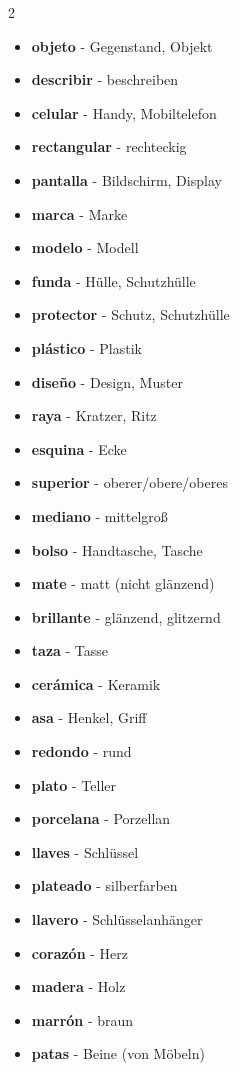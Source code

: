 \documentclass[12pt,a4paper]{article}
\begin{document}
\begin{multicols}{2}
\begin{itemize}[leftmargin=*]
    \item \textbf{objeto} - Gegenstand, Objekt
    \item \textbf{describir} - beschreiben
    \item \textbf{celular} - Handy, Mobiltelefon
    \item \textbf{rectangular} - rechteckig
    \item \textbf{pantalla} - Bildschirm, Display
    \item \textbf{marca} - Marke
    \item \textbf{modelo} - Modell
    \item \textbf{funda} - Hülle, Schutzhülle
    \item \textbf{protector} - Schutz, Schutzhülle
    \item \textbf{plástico} - Plastik
    \item \textbf{diseño} - Design, Muster
    \item \textbf{raya} - Kratzer, Ritz
    \item \textbf{esquina} - Ecke
    \item \textbf{superior} - oberer/obere/oberes
    \item \textbf{mediano} - mittelgroß
    \item \textbf{bolso} - Handtasche, Tasche
    \item \textbf{mate} - matt (nicht glänzend)
    \item \textbf{brillante} - glänzend, glitzernd
    \item \textbf{taza} - Tasse
    \item \textbf{cerámica} - Keramik
    \item \textbf{asa} - Henkel, Griff
    \item \textbf{redondo} - rund
    \item \textbf{plato} - Teller
    \item \textbf{porcelana} - Porzellan
    \item \textbf{llaves} - Schlüssel
    \item \textbf{plateado} - silberfarben
    \item \textbf{llavero} - Schlüsselanhänger
    \item \textbf{corazón} - Herz
    \item \textbf{madera} - Holz
    \item \textbf{marrón} - braun
    \item \textbf{patas} - Beine (von Möbeln)

\end{itemize}
\end{multicols}
\end{document}
